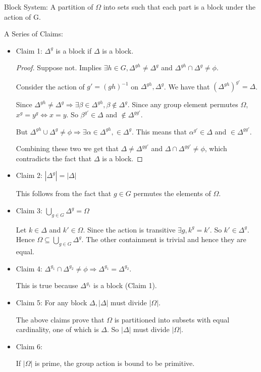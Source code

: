 \begin{defn}{Block System:}
A partition of $\Omega$ into sets such that each part is a block under the action of G.
\end{defn}

{\sf A Series of Claims:}

\begin{itemize}
\item
Claim 1: $\Delta^g$ is a block if $\Delta$ is a block. 

\begin{proof}
Suppose not. Implies $\exists h \in G, \Delta^{gh} \ne \Delta^g$ and $\Delta^{gh} \cap \Delta^g \ne \phi$.

Consider the action of $g' = (gh)^{-1}$ on $\Delta^{gh}, \Delta^g$. We have that $(\Delta^{gh})^{g'} = \Delta$.

Since $\Delta^{gh} \ne \Delta^g \Rightarrow \exists \beta \in \Delta^{gh}, \beta \notin \Delta^g$. Since any group element permutes $\Omega$, $x^g = y^g \Leftrightarrow x = y$. So $\beta^{g'} \in \Delta$ and $\notin \Delta^{gg'}$.

But $\Delta^{gh} \cup \Delta^g \ne \phi \Rightarrow \exists \alpha \in \Delta^{gh}, \in \Delta^g$. This means that $\alpha^{g'} \in \Delta$ and $\in \Delta^{gg'}$. 

Combining these two we get that $\Delta \ne \Delta^{gg'}$ and $\Delta \cap \Delta^{gg'} \ne \phi$, which contradicts the fact that $\Delta$ is a block.

\end{proof}

\item
Claim 2: $|\Delta^g| = |\Delta|$

This follows from the fact that $g \in G$ permutes the elements of $\Omega$.

\item

Claim 3: $\bigcup_{g \in G} \Delta^g = \Omega$

Let $k \in \Delta$ and $k' \in \Omega$. Since the action is transitive $\exists g, k^g = k'$. So $k' \in \Delta^g$. Hence $\Omega \subseteq \bigcup_{g \in G} \Delta^g $. The other containment is trivial and hence they are equal.

\item

Claim 4: $\Delta^{g_1} \cap \Delta^{g_2} \ne \phi \Rightarrow \Delta^{g_1} = \Delta^{g_2}$. 

This is true because $\Delta^{g_1}$ is a block (Claim 1).

\item

Claim 5: For any block $\Delta , |\Delta|$ must divide $|\Omega|$.

The above claims prove that $\Omega$ is partitioned into subsets with equal cardinality, one of which is $\Delta$. So $|\Delta|$ must divide $|\Omega|$. 

\item
Claim 6:

If $|\Omega |$ is prime, the group action is bound to be primitive. 

\end{itemize}

